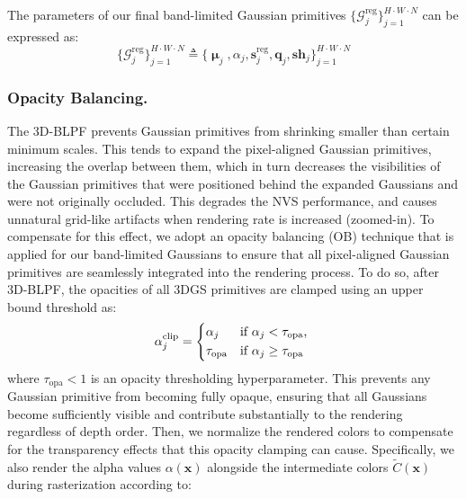 \documentclass[runningheads]{llncs}
\begin{document}
The parameters of our final band-limited Gaussian primitives $\{\mathcal{G}_j^\text{reg}\}_{j=1}^{H\cdot W\cdot N}$ can be expressed as:
\begin{equation}
    \{\mathcal{G}_j^\text{reg}\}_{j=1}^{H\cdot W\cdot N}\triangleq\{\bm{\upmu}_j,\alpha_j,\mathbf{s}_j^\text{reg},\mathbf{q}_j,\mathbf{sh}_j\}_{j=1}^{H\cdot W\cdot N}
    \label{eq:bandlimited-gs}
\end{equation}

\subsubsection{Opacity Balancing.}

The 3D-BLPF prevents Gaussian primitives from shrinking smaller than certain minimum scales. This tends to expand the pixel-aligned Gaussian primitives, increasing the overlap between them, which in turn decreases the visibilities of the Gaussian primitives that were positioned behind the expanded Gaussians and were not originally occluded. This degrades the NVS performance, and causes unnatural grid-like artifacts when rendering rate is increased (zoomed-in). To compensate for this effect, we adopt an opacity balancing (OB) technique \cite{he2026surfsplat} that is applied for our band-limited Gaussians to ensure that all pixel-aligned Gaussian primitives are seamlessly integrated into the rendering process. To do so, after 3D-BLPF, the opacities of all 3DGS primitives are clamped using an upper bound threshold as:
\begin{equation}
  \begin{split}
  \alpha_j^\text{clip} = 
  \begin{dcases*} 
  \alpha_j & if  $\alpha_j < \tau_\text{opa}$, \\ 
  \tau_\text{opa} & if $\alpha_j \geq \tau_\text{opa}$
  \end{dcases*} 
  \end{split}
  \label{eq:opacity-thresholding}
\end{equation}
where $\tau_\text{opa}<1$ is an opacity thresholding hyperparameter. This prevents any Gaussian primitive from becoming fully opaque, ensuring that all Gaussians become sufficiently visible and contribute substantially to the rendering regardless of depth order.
Then, we normalize the rendered colors to compensate for the transparency effects that this opacity clamping can cause. Specifically, we also render the alpha values $\alpha(\mathbf{x})$ alongside the intermediate colors $\tilde{C}(\mathbf{x})$ during rasterization according to:
\end{document}
